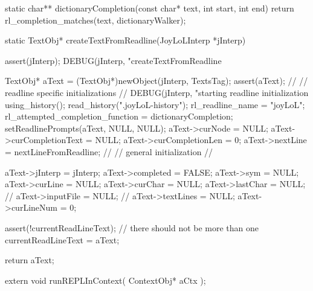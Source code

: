 static char** dictionaryCompletion(const char* text, int start, int end) {
 return rl_completion_matches(text, dictionaryWalker);
}
\stopCCode

\startCCode
static TextObj* createTextFromReadline(JoyLoLInterp *jInterp) {
  
  assert(jInterp);
  DEBUG(jInterp, "createTextFromReadline %
  
  TextObj* aText = (TextObj*)newObject(jInterp, TextsTag);
  assert(aText);
  //
  // readline specific initializations
  //
  DEBUG(jInterp, "starting readline initialization %
  using_history();
  read_history(".joyLoL-history");
  rl_readline_name = "joyLoL";
  rl_attempted_completion_function = dictionaryCompletion;
  setReadlinePrompts(aText, NULL, NULL);
  aText->curNode = NULL;
  aText->curCompletionText = NULL;
  aText->curCompletionLen  = 0;
  aText->nextLine = nextLineFromReadline;
  //
  // general initialization
  //

  aText->jInterp    = jInterp;
  aText->completed  = FALSE;
  aText->sym        = NULL;
  aText->curLine    = NULL;
  aText->curChar    = NULL;
  aText->lastChar   = NULL;
  //
  aText->inputFile = NULL;
  //
  aText->textLines  = NULL;
  aText->curLineNum = 0;

  assert(!currentReadLineText); // there should not be more than one
  currentReadLineText = aText;

  return aText;
}
\stopCCode

\startCHeader
extern void runREPLInContext(
  ContextObj* aCtx
);
\stopCHeader

